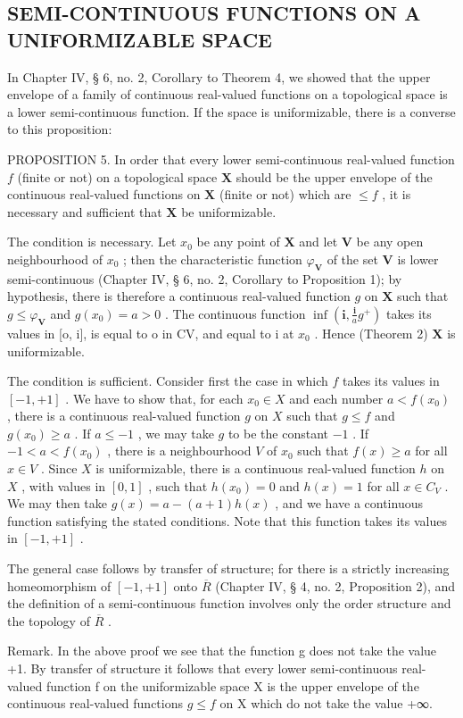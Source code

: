 \subsection{SEMI-CONTINUOUS FUNCTIONS ON A UNIFORMIZABLE SPACE}

In Chapter IV, § 6, no. 2, Corollary to Theorem 4, we showed that the upper envelope of a family of continuous real-valued functions on a topological space is a lower semi-continuous function. If the space is uniformizable, there is a converse to this proposition:

PROPOSITION 5. In order that every lower semi-continuous real-valued function \(f\) (finite or not) on a topological space \(\mathbf{X}\) should be the upper envelope of the continuous real-valued functions on \(\mathbf{X}\) (finite or not) which are \(\leqslant f\) , it is necessary and sufficient that \(\mathbf{X}\) be uniformizable.

The condition is necessary. Let \(x_0\) be any point of \(\mathbf{X}\) and let \(\mathbf{V}\) be any open neighbourhood of \(x_0\) ; then the characteristic function \(\varphi_{\mathbf{V}}\) of the set \(\mathbf{V}\) is lower semi-continuous (Chapter IV, § 6, no. 2, Corollary to Proposition 1); by hypothesis, there is therefore a continuous real-valued function \(g\) on \(\mathbf{X}\) such that \(g \leqslant \varphi_{\mathbf{V}}\) and \(g(x_0) = a > 0\) . The continuous function \(\inf\left(\mathbf{i}, \frac{\mathbf{i}}{a} g^+\right)\) takes its values in {[}o, i{]}, is equal to o in CV, and equal to i at \(x_0\) . Hence (Theorem 2) \(\mathbf{X}\) is uniformizable.

The condition is sufficient. Consider first the case in which \(f\) takes its values in \([-1, +1]\) . We have to show that, for each \(x_0 \in X\) and each number \(a < f(x_0)\) , there is a continuous real-valued function \(g\) on \(X\) such that \(g \leqslant f\) and \(g(x_0) \geqslant a\) . If \(a \leqslant -1\) , we may take \(g\) to be the constant \(-1\) . If \(-1 < a < f(x_0)\) , there is a neighbourhood \(V\) of \(x_0\) such that \(f(x) \geqslant a\) for all \(x \in V\) . Since \(X\) is uniformizable, there is a continuous real-valued function \(h\) on \(X\) , with values in \([0, 1]\) , such that \(h(x_0) = 0\) and \(h(x) = 1\) for all \(x \in C_V\) . We may then take \(g(x) = a - (a + 1)h(x)\) , and we have a continuous function satisfying the stated conditions. Note that this function takes its values in \([-1, +1]\) .

The general case follows by transfer of structure; for there is a strictly increasing homeomorphism of \([-1, +1]\) onto \(\overline{R}\) (Chapter IV, § 4, no. 2, Proposition 2), and the definition of a semi-continuous function involves only the order structure and the topology of \(\overline{R}\) .

Remark. In the above proof we see that the function g does not take the value +1. By transfer of structure it follows that every lower semi-continuous real-valued function f on the uniformizable space X is the upper envelope of the continuous real-valued functions \(g \leqslant f\) on X which do not take the value +∞.

